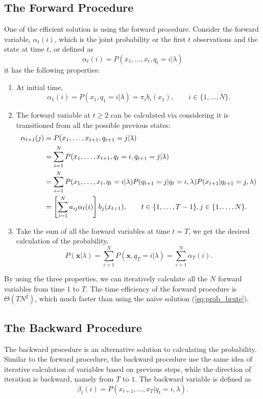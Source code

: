 \documentclass[12pt,final,twoside]{report}
\begin{document}
\subsection{The Forward Procedure}
One of the efficient solution is using the forward procedure. Consider the forward variable, $\alpha_t(i)$, which is the joint probability or the first $t$ observations and the state at time $t$, or defined as
\begin{equation}
  \alpha_t(i) = P(x_1,\dots,x_t,q_t=i|\lambda) 
\end{equation}
it has the following properties:
\begin{enumerate}
  \item At initial time,
    \begin{equation}
      \alpha_1(i) = P(x_1,q_1=i|\lambda) = \pi_i b_i(x_1), \qquad i \in \{1,\dots,N\} .
    \end{equation}
  \item The forward variable at $t \geq 2$ can be calculated via considering it is transitioned from all the possible previous states:
    \begin{align}
      \alpha_{t+1}(j) &= P(x_1,\dots,x_{t+1},q_{t+1}=j|\lambda) \notag\\
      &= \sum_{i=1}^{N} P(x_1,\dots,x_{t+1},q_t=i,q_{t+1}=j|\lambda) \notag\\
      &= \sum_{i=1}^{N} P(x_1,\dots,x_t,q_t=i|\lambda) P(q_{t+1}=j|q_t=i,\lambda) P(x_{t+1}|q_{t+1}=j,\lambda) \notag\\
      &= \left[ \sum_{i=1}^{N} a_{ij} \alpha_t(i) \right] b_j(x_{t+1}), \qquad t \in \{1,\dots,T - 1\}, j \in \{1,\dots,N\} .
    \end{align}
  \item Take the sum of all the forward variables at time $t = T$, we get the desired calculation of the probability,
    \begin{equation}
      P(\mathbf{x}|\lambda) = \sum_{i=1}^N P(\mathbf{x},q_T=i|\lambda) = \sum_{i=1}^N \alpha_T(i) .
    \end{equation}
\end{enumerate}

By using the three properties, we can iteratively calculate all the $N$ forward variables from time $1$ to $T$. The time efficiency of the forward procedure is $\Theta(TN^2)$, which much faster than using the na\"ive solution (\cref{eq:prob_brute}).

\subsection{The Backward Procedure}
The backward procedure is an alternative solution to calculating the probability. Similar to the forward procedure, the backward procedure use the same idea of iterative calculation of variables based on previous steps, while the direction of iteration is backward, namely from $T$ to $1$. The backward variable is defined as
\begin{equation}
  \beta_t(i) = P(x_{t+1},\dots,x_T|q_t=i,\lambda) .
\end{equation}
\end{document}
